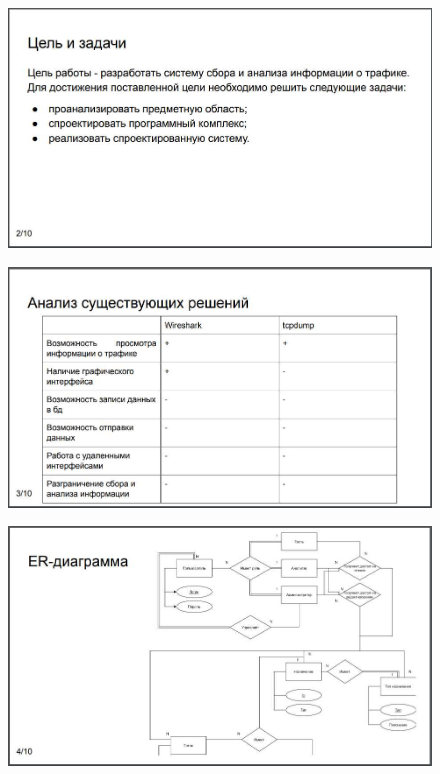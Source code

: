 \begin{figure}[H]
	\centering
	\includegraphics[scale=0.35]{pr2.jpg}
\end{figure}
\begin{figure}[H]
	\centering
	\includegraphics[scale=0.35]{pr3.jpg}
\end{figure}
\begin{figure}[H]
	\centering
	\includegraphics[scale=0.35]{pr4.jpg}
\end{figure}
